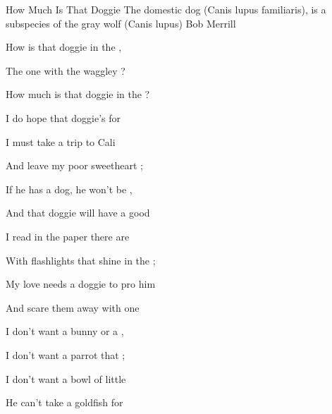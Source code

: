 \begin{SBSong}{How Much Is That Doggie}
  {The domestic dog (Canis lupus familiaris), is a subspecies of the gray wolf (Canis lupus)}
  {Bob Merrill}
  \begin{SBChorus}
    How  is that doggie in the ,
    
    The one with the waggley ?
    
    How much is that doggie in the ?
    
    I do hope that doggie's for  
  \end{SBChorus}
  \begin{SBVerse}
    I must take a trip to Cali
    
    And leave my poor sweetheart ;
    
    If he has a dog, he won't be ,
    
    And that doggie will have a good  
  \end{SBVerse}
  \begin{SBVerse}
    I read in the paper there are 

    With flashlights that shine in the ;

    My love needs a doggie to pro him

    And scare them away with one  
  \end{SBVerse}
  \begin{SBVerse}
    I don't want a bunny or a ,
    
    I don't want a parrot that ;
    
    I don't want a bowl of little 
    
    He can't take a goldfish for  
  \end{SBVerse}
\end{SBSong}